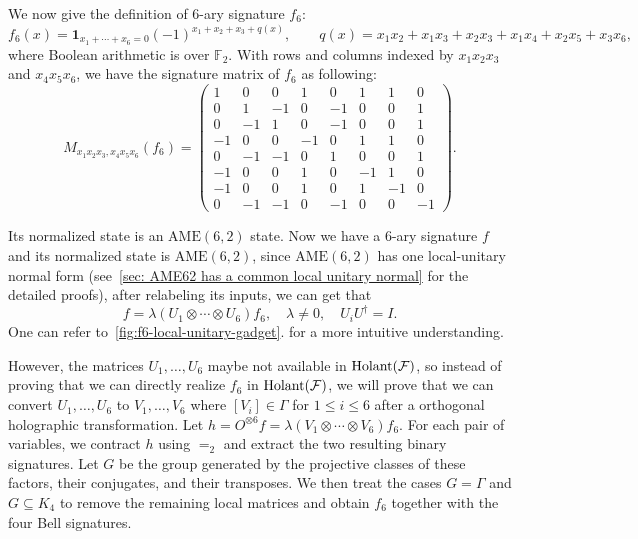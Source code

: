 We now give the definition of 6-ary signature $f_6$:
\[
 f_6(x)=\mathbf1_{x_1+\cdots+x_6=0}
 (-1)^{x_1+x_2+x_3+q(x)},\qquad
 q(x)=x_1x_2+x_1x_3+x_2x_3+x_1x_4+x_2x_5+x_3x_6,
\]
where Boolean arithmetic is over $\mathbb{F}_2$. With rows and columns indexed by $x_1x_2x_3$ and $x_4x_5x_6$, we have the signature matrix of $f_6$ as following:
\begingroup
\setlength{\arraycolsep}{4pt}
\renewcommand{\arraystretch}{1.1}
\[
M_{x_1x_2x_3,x_4x_5x_6}(f_6)=
\begin{pmatrix}
 1 &  0 &  0 &  1 &  0 &  1 &  1 &  0 \\
 0 &  1 & -1 &  0 & -1 &  0 &  0 &  1 \\
 0 & -1 &  1 &  0 & -1 &  0 &  0 &  1 \\
-1 &  0 &  0 & -1 &  0 &  1 &  1 &  0 \\
 0 & -1 & -1 &  0 &  1 &  0 &  0 &  1 \\
-1 &  0 &  0 &  1 &  0 & -1 &  1 &  0 \\
-1 &  0 &  0 &  1 &  0 &  1 & -1 &  0 \\
 0 & -1 & -1 &  0 & -1 &  0 &  0 & -1
\end{pmatrix}.
\]
\endgroup

Its normalized state is an $\mathrm{AME}(6,2)$ state. Now we have a 6-ary signature $f$ and its normalized state is $\mathrm{AME}(6,2)$, since $\mathrm{AME}(6,2)$ has one local-unitary normal form (see~\cref{sec: AME62 has a common local unitary normal} for the detailed proofs), after relabeling its inputs, we can get that 
\begin{equation}\label{eq:f6-local-unitary-form}
    f=\lambda(U_1\otimes\cdots \otimes U_6)f_6, \quad \lambda\neq 0, \quad U_iU^\dagger=I.
\end{equation}
One can refer to~\cref{fig:f6-local-unitary-gadget}. for a more intuitive understanding.

However, the matrices $U_1,\dots,U_6$ maybe not available in $\operatorname{Holant}(\mathcal{F})$, so instead of proving that we can directly realize $f_6$ in $\operatorname{Holant}(\mathcal{F})$,
we will prove that we can convert $U_1,\dots,U_6$ to $V_1,\dots,V_6$ where $[V_i]\in \Gamma$ for $1\leq i\leq 6$ after a orthogonal holographic transformation. Let $h=O^{\otimes6}f=\lambda(V_1\otimes\cdots\otimes V_6)f_6$.
For each pair of variables, we contract $h$ using $=_2$ and extract
the two resulting binary signatures. Let $G$ be the group generated by
the projective classes of these factors, their conjugates, and their
transposes. We then treat the cases $G=\Gamma$ and $G\subseteq K_4$
to remove the remaining local matrices and obtain $f_6$ together
with the four Bell signatures.

